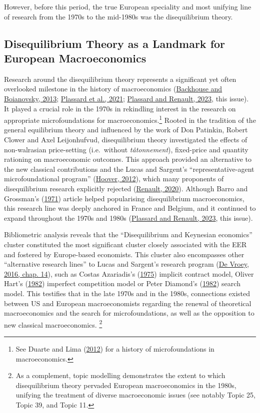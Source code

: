 \documentclass[
  12pt,
  onecolumn]{article}
\begin{document}
However, before this period, the true European speciality and most unifying line of research from the 1970s to the mid-1980s was the disequilibrium theory.

\hypertarget{disequilibrium}{%
\subsection{Disequilibrium Theory as a Landmark for European Macroeconomics}\label{disequilibrium}}

Research around the disequilibrium theory represents a significant yet often overlooked milestone in the history of macroeconomics (\protect\hyperlink{ref-backhouseboianovski2013}{Backhouse and Boianovsky, 2013}; \protect\hyperlink{ref-plassard2021}{Plassard et al., 2021}; \protect\hyperlink{ref-plassard2023}{Plassard and Renault, 2023}, this issue). It played a crucial role in the 1970s in rekindling interest in the research on appropriate microfoundations for macroeconomics.\footnote{See Duarte and Lima (\protect\hyperlink{ref-duartelima2012a}{2012}) for a history of microfoundations in macroeconomics.} Rooted in the tradition of the general equilibrium theory and influenced by the work of Don Patinkin, Robert Clower and Axel Leijonhufvud, disequilibrium theory investigated the effects of non-walrasian price-setting (i.e.~without \emph{tâtonnement}), fixed-price and quantity rationing on macroeconomic outcomes. This approach provided an alternative to the new classical contributions and the Lucas and Sargent's ``representative-agent microfoundational program'' (\protect\hyperlink{ref-hoover2012}{Hoover, 2012}), which many proponents of disequilibrium research explicitly rejected (\protect\hyperlink{ref-renault2020a}{Renault, 2020}). Although Barro and Grossman's (\protect\hyperlink{ref-barro1971}{1971}) article helped popularising disequilibrium macroeconomics, this research line was deeply anchored in France and Belgium, and it continued to expand throughout the 1970s and 1980s (\protect\hyperlink{ref-plassard2023}{Plassard and Renault, 2023}, this issue).

Bibliometric analysis reveals that the ``Disequilibrium and Keynesian economics'' cluster constituted the most significant cluster closely associated with the EER and fostered by Europe-based economists. This cluster also encompasses other ``alternative research lines'' to Lucas and Sargent's research program (\protect\hyperlink{ref-devroey2016}{De Vroey, 2016, chap. 14}), such as Costas Azariadis's (\protect\hyperlink{ref-azariadis1975}{1975}) implicit contract model, Oliver Hart's (\protect\hyperlink{ref-hart1982}{1982}) imperfect competition model or Peter Diamond's (\protect\hyperlink{ref-diamond1982}{1982}) search model. This testifies that in the late 1970s and in the 1980s, connections existed between US and European macroeconomists regarding the renewal of theoretical macroeconomics and the search for microfoundations, as well as the opposition to new classical macroeconomics. \footnote{As a complement, topic modelling demonstrates the extent to which disequilibrium theory pervaded European macroeconomics in the 1980s, unifying the treatment of diverse macroeconomic issues (see notably Topic 25, Topic 39, and Topic 11.}
\end{document}
